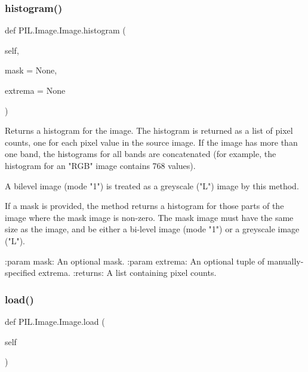 \mbox{\label{classPIL_1_1Image_1_1Image_a57c61ae60c45eaaf38778e044223d350}} 
\subsubsection{\texorpdfstring{histogram()}{histogram()}}
{\footnotesize\ttfamily def P\+I\+L.\+Image.\+Image.\+histogram (\begin{DoxyParamCaption}\item[{}]{self,  }\item[{}]{mask = {\ttfamily None},  }\item[{}]{extrema = {\ttfamily None} }\end{DoxyParamCaption})}

\begin{DoxyVerb}Returns a histogram for the image. The histogram is returned as
a list of pixel counts, one for each pixel value in the source
image. If the image has more than one band, the histograms for
all bands are concatenated (for example, the histogram for an
"RGB" image contains 768 values).

A bilevel image (mode "1") is treated as a greyscale ("L") image
by this method.

If a mask is provided, the method returns a histogram for those
parts of the image where the mask image is non-zero. The mask
image must have the same size as the image, and be either a
bi-level image (mode "1") or a greyscale image ("L").

:param mask: An optional mask.
:param extrema: An optional tuple of manually-specified extrema.
:returns: A list containing pixel counts.
\end{DoxyVerb}
 \mbox{\label{classPIL_1_1Image_1_1Image_aa2814da0ea6911910f8827202413bcc8}} 
\subsubsection{\texorpdfstring{load()}{load()}}
{\footnotesize\ttfamily def P\+I\+L.\+Image.\+Image.\+load (\begin{DoxyParamCaption}\item[{}]{self }\end{DoxyParamCaption})}

